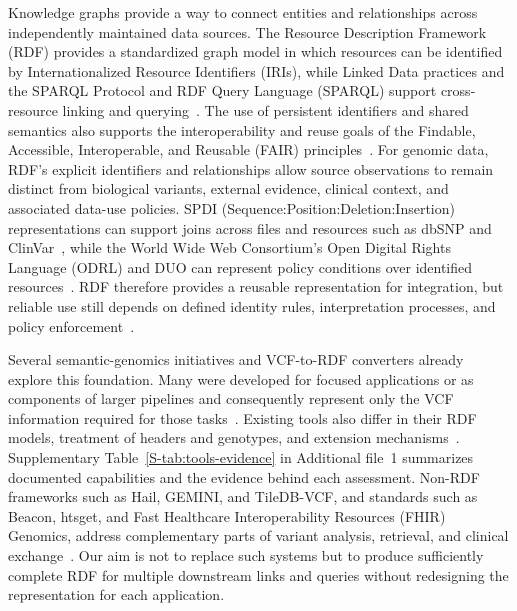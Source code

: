 \documentclass[pdflatex,sn-mathphys-num,referee]{sn-jnl}
\begin{document}
Knowledge graphs provide a way to connect entities and relationships across independently maintained data sources.
The Resource Description Framework (RDF) provides a standardized graph model in which resources can be identified by Internationalized Resource Identifiers (IRIs), while Linked Data practices and the SPARQL Protocol and RDF Query Language (SPARQL) support cross-resource linking and querying~\cite{rdf,hogan_knowledge_graphs_2021,W3CLinkedDataWiki,sparqllang}.
The use of persistent identifiers and shared semantics also supports the interoperability and reuse goals of the Findable, Accessible, Interoperable, and Reusable (FAIR) principles~\cite{wilkinson2016fair}.
For genomic data, RDF's explicit identifiers and relationships allow source observations to remain distinct from biological variants, external evidence, clinical context, and associated data-use policies.
SPDI (Sequence:Position:Deletion:Insertion) representations can support joins across files and resources such as dbSNP and ClinVar~\cite{holmes2020spdi,sherry2001dbsnp,landrum2018clinvar}, while the World Wide Web Consortium's Open Digital Rights Language (ODRL) and DUO can represent policy conditions over identified resources~\cite{odrl_2018,lawson2021duo}.
RDF therefore provides a reusable representation for integration, but reliable use still depends on defined identity rules, interpretation processes, and policy enforcement~\cite{odrl_2018,xacml3_2013}.

Several semantic-genomics initiatives and VCF-to-RDF converters already explore this foundation.
Many were developed for focused applications or as components of larger pipelines and consequently represent only the VCF information required for those tasks~\cite{katayama2019biohackathon,JVarkit_2015,bio_vcf,togovar_2022,semantic_beac_2025}.
Existing tools also differ in their RDF models, treatment of headers and genotypes, and extension mechanisms~\cite{togovar_2022,JVarkit_2015,sparqling_genomics_2020,sparqling_genomics_software,baran2015gfvo}.
Supplementary Table~\ref{S-tab:tools-evidence} in Additional file~1 summarizes documented capabilities and the evidence behind each assessment.
Non-RDF frameworks such as Hail, GEMINI, and TileDB-VCF, and standards such as Beacon, htsget, and Fast Healthcare Interoperability Resources (FHIR) Genomics, address complementary parts of variant analysis, retrieval, and clinical exchange~\cite{hail_software,paila2013gemini,tiledb_vcf_software,rambla2022beacon,kelleher2019htsget,fhir_genomics_ig}.
Our aim is not to replace such systems but to produce sufficiently complete RDF for multiple downstream links and queries without redesigning the representation for each application.
\end{document}
